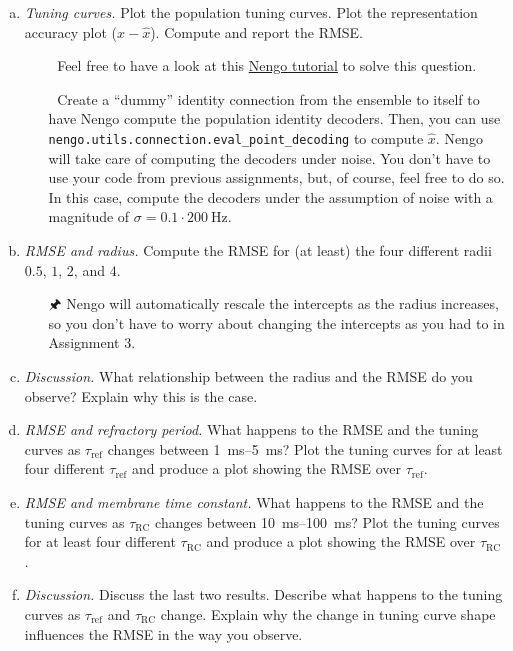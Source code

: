 	\begin{enumerate}[a)]
		\item {} \emph{Tuning curves.} Plot the population tuning curves. Plot the representation accuracy plot ($x - \hat{x}$). Compute and report the RMSE.
		\begin{itemize}
			\item[{\symbolfont 🐍}]  Feel free to have a look at this \href{https://www.nengo.ai/nengo/examples/usage/tuning-curves.html}{Nengo tutorial} to solve this question.
			\item[{\symbolfont 🐍}] Create a \enquote{dummy} identity connection from the ensemble to itself to have Nengo compute the population identity decoders. Then, you can use \texttt{nengo.utils.connection.eval\_point\_decoding} to compute $\hat{x}$. Nengo will take care of computing the decoders under noise. You don't have to use your code from previous assignments, but, of course, feel free to do so. In this case, compute the decoders under the assumption of noise with a magnitude of $\sigma = 0.1 \cdot \SI{200}{\hertz}$.
		\end{itemize}
		\item {} \emph{RMSE and radius.} Compute the RMSE for (at least) the four different radii $0.5$, $1$, $2$, and $4$.
		\begin{itemize}
			\item[{\symbolfont 🖈}]  Nengo will automatically rescale the intercepts as the radius increases, so you don't have to worry about changing the intercepts as you had to in Assignment 3.
		\end{itemize}
		\item {} \emph{Discussion.} What relationship between the radius and the RMSE do you observe? Explain why this is the case.
		\item {} \emph{RMSE and refractory period.} What happens to the RMSE and the tuning curves as $\tau_\mathrm{ref}$ changes between \SIrange{1}{5}{\milli\second}? Plot the tuning curves for at least four different $\tau_\mathrm{ref}$ and produce a plot showing the RMSE over $\tau_\mathrm{ref}$.
		\item {} \emph{RMSE and membrane time constant.} What happens to the RMSE and the tuning curves as $\tau_\mathrm{RC}$ changes between \SIrange{10}{100}{\milli\second}? Plot the tuning curves for at least four different $\tau_\mathrm{RC}$ and produce a plot showing the RMSE over $\tau_\mathrm{RC}$.
		\item {} \emph{Discussion.} Discuss the last two results. Describe what happens to the tuning curves as $\tau_\mathrm{ref}$ and $\tau_\mathrm{RC}$ change. Explain why the change in tuning curve shape influences the RMSE in the way you observe.
	\end{enumerate}


